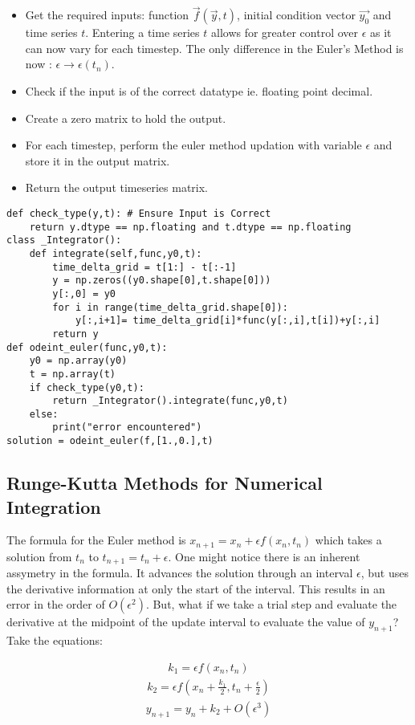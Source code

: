 \documentclass[10pt,letterpaper]{article}
\begin{document}
\begin{itemize}
\item Get the required inputs: function $\vec{f}(\vec{y},t)$, initial condition vector $\vec{y_0}$ and time series $t$. Entering a time series $t$ allows for greater control over $\epsilon$ as it can now vary for each timestep. The only difference in the Euler's Method is now : $\epsilon\rightarrow\epsilon(t_n)$.
\item Check if the input is of the correct datatype ie. floating point decimal.
\item Create a zero matrix to hold the output.
\item For each timestep, perform the euler method updation with variable $\epsilon$ and store it in the output matrix.
\item Return the output timeseries matrix.
\end{itemize}

\begin{verbatim}
def check_type(y,t): # Ensure Input is Correct
    return y.dtype == np.floating and t.dtype == np.floating
class _Integrator():
    def integrate(self,func,y0,t):
        time_delta_grid = t[1:] - t[:-1]
        y = np.zeros((y0.shape[0],t.shape[0]))
        y[:,0] = y0
        for i in range(time_delta_grid.shape[0]):
            y[:,i+1]= time_delta_grid[i]*func(y[:,i],t[i])+y[:,i]
        return y
def odeint_euler(func,y0,t):
    y0 = np.array(y0)
    t = np.array(t)
    if check_type(y0,t):
        return _Integrator().integrate(func,y0,t)
    else:
        print("error encountered")
solution = odeint_euler(f,[1.,0.],t)
\end{verbatim}

\subsection*{Runge-Kutta Methods for Numerical Integration}

The formula for the Euler method is $x_{n+1}=x_n + \epsilon f(x_n,t_n)$ which takes a solution from $t_n$ to $t_{n+1}=t_n+\epsilon$. One might notice there is an inherent assymetry in the formula. It advances the solution through an interval $\epsilon$, but uses the derivative information at only the start of the interval. This results in an error in the order of $O(\epsilon^2)$. But, what if we take a trial step and evaluate the derivative at the midpoint of the update interval to evaluate the value of $y_{n+1}$? Take the equations:

\begin{eqnarray}k_1=\epsilon f(x_n,t_n)\end{eqnarray}
\begin{eqnarray}k_2=\epsilon f(x_n+\frac{k_1}{2},t_n+\frac{\epsilon}{2})\end{eqnarray}
\begin{eqnarray}y_{n+1}=y_n+k_2+O(\epsilon^3)\end{eqnarray}
\end{document}
